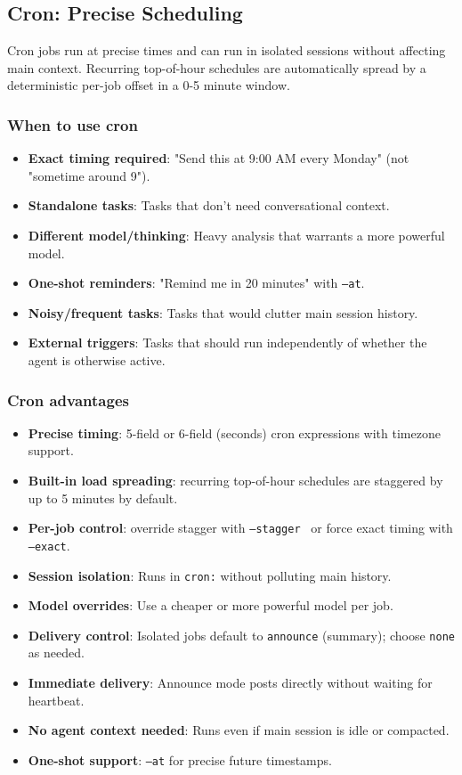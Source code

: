 \subsection{Cron: Precise Scheduling}


Cron jobs run at precise times and can run in isolated sessions without affecting main context.
Recurring top-of-hour schedules are automatically spread by a deterministic
per-job offset in a 0-5 minute window.

\subsubsection{When to use cron}


\begin{itemize}
  \item \textbf{Exact timing required}: "Send this at 9:00 AM every Monday" (not "sometime around 9").
  \item \textbf{Standalone tasks}: Tasks that don't need conversational context.
  \item \textbf{Different model/thinking}: Heavy analysis that warrants a more powerful model.
  \item \textbf{One-shot reminders}: "Remind me in 20 minutes" with \texttt{--at}.
  \item \textbf{Noisy/frequent tasks}: Tasks that would clutter main session history.
  \item \textbf{External triggers}: Tasks that should run independently of whether the agent is otherwise active.
\end{itemize}


\subsubsection{Cron advantages}


\begin{itemize}
  \item \textbf{Precise timing}: 5-field or 6-field (seconds) cron expressions with timezone support.
  \item \textbf{Built-in load spreading}: recurring top-of-hour schedules are staggered by up to 5 minutes by default.
  \item \textbf{Per-job control}: override stagger with \texttt{--stagger } or force exact timing with \texttt{--exact}.
  \item \textbf{Session isolation}: Runs in \texttt{cron:} without polluting main history.
  \item \textbf{Model overrides}: Use a cheaper or more powerful model per job.
  \item \textbf{Delivery control}: Isolated jobs default to \texttt{announce} (summary); choose \texttt{none} as needed.
  \item \textbf{Immediate delivery}: Announce mode posts directly without waiting for heartbeat.
  \item \textbf{No agent context needed}: Runs even if main session is idle or compacted.
  \item \textbf{One-shot support}: \texttt{--at} for precise future timestamps.
\end{itemize}


